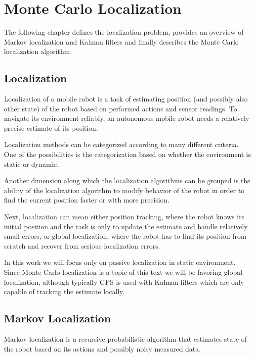 
\chapter{Monte Carlo Localization}
\label{chap:mcl}

The following chapter defines the localization problem, provides an overview
of Markov localization and Kalman filters and finally describes
the Monte Carlo localization algorithm.

\section{Localization}
Localization of a mobile robot is a task of estimating position (and possibly
also other state) of the robot based on performed actions and sensor readings.
To navigate its environment reliably, an autonomous mobile robot needs
a relatively precise estimate of its position.

Localization methods can be categorized according to many different criteria.
One of the possibilities is the categorization based on whether the environment is static
or dynamic.

Another dimension along which the localization algorithms can be grouped
is the ability of the localization algorithm to modify behavior of the robot
in order to find the current position faster or with more precision.

Next, localization can mean either position tracking, where the robot knows its initial
position and the task is only to update the estimate and handle relatively small
errors, or global localization, where the robot has to find its position from scratch
and recover from serious localization errors.

In this work we will focus only on passive localization in static environment.
Since Monte Carlo localization is a topic of this text we will be favoring
global localization, although typically GPS is used with Kalman filters
which are only capable of tracking the estimate locally.

\section{Markov Localization}

Markov localization \cite{fox98,diard03} is a recursive probabilistic
algorithm that estimates state of the robot based on its
actions and possibly noisy measured data.

